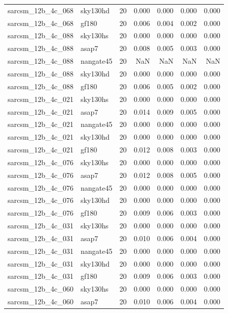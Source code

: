 \begin{tabular}{llrrrrr}
sarcsm\_12b\_4c\_068 & sky130hd & 20 & 0.000 & 0.000 & 0.000 & 0.000 \\
sarcsm\_12b\_4c\_068 & gf180 & 20 & 0.006 & 0.004 & 0.002 & 0.000 \\
sarcsm\_12b\_4c\_088 & sky130hs & 20 & 0.000 & 0.000 & 0.000 & 0.000 \\
sarcsm\_12b\_4c\_088 & asap7 & 20 & 0.008 & 0.005 & 0.003 & 0.000 \\
sarcsm\_12b\_4c\_088 & nangate45 & 20 & NaN & NaN & NaN & NaN \\
sarcsm\_12b\_4c\_088 & sky130hd & 20 & 0.000 & 0.000 & 0.000 & 0.000 \\
sarcsm\_12b\_4c\_088 & gf180 & 20 & 0.006 & 0.005 & 0.002 & 0.000 \\
sarcsm\_12b\_4c\_021 & sky130hs & 20 & 0.000 & 0.000 & 0.000 & 0.000 \\
sarcsm\_12b\_4c\_021 & asap7 & 20 & 0.014 & 0.009 & 0.005 & 0.000 \\
sarcsm\_12b\_4c\_021 & nangate45 & 20 & 0.000 & 0.000 & 0.000 & 0.000 \\
sarcsm\_12b\_4c\_021 & sky130hd & 20 & 0.000 & 0.000 & 0.000 & 0.000 \\
sarcsm\_12b\_4c\_021 & gf180 & 20 & 0.012 & 0.008 & 0.003 & 0.000 \\
sarcsm\_12b\_4c\_076 & sky130hs & 20 & 0.000 & 0.000 & 0.000 & 0.000 \\
sarcsm\_12b\_4c\_076 & asap7 & 20 & 0.012 & 0.008 & 0.005 & 0.000 \\
sarcsm\_12b\_4c\_076 & nangate45 & 20 & 0.000 & 0.000 & 0.000 & 0.000 \\
sarcsm\_12b\_4c\_076 & sky130hd & 20 & 0.000 & 0.000 & 0.000 & 0.000 \\
sarcsm\_12b\_4c\_076 & gf180 & 20 & 0.009 & 0.006 & 0.003 & 0.000 \\
sarcsm\_12b\_4c\_031 & sky130hs & 20 & 0.000 & 0.000 & 0.000 & 0.000 \\
sarcsm\_12b\_4c\_031 & asap7 & 20 & 0.010 & 0.006 & 0.004 & 0.000 \\
sarcsm\_12b\_4c\_031 & nangate45 & 20 & 0.000 & 0.000 & 0.000 & 0.000 \\
sarcsm\_12b\_4c\_031 & sky130hd & 20 & 0.000 & 0.000 & 0.000 & 0.000 \\
sarcsm\_12b\_4c\_031 & gf180 & 20 & 0.009 & 0.006 & 0.003 & 0.000 \\
sarcsm\_12b\_4c\_060 & sky130hs & 20 & 0.000 & 0.000 & 0.000 & 0.000 \\
sarcsm\_12b\_4c\_060 & asap7 & 20 & 0.010 & 0.006 & 0.004 & 0.000 \\

\end{tabular}
